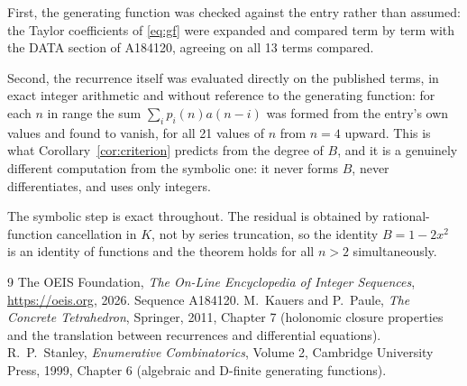 \documentclass[11pt,a4paper]{article}
\theoremstyle{plain}
\theoremstyle{definition}
\begin{document}
First, the generating function was checked against the entry rather than assumed: the
Taylor coefficients of \eqref{eq:gf} were expanded and compared term by term with the DATA
section of A184120, agreeing on all 13 terms compared.

Second, the recurrence itself was evaluated directly on the published terms, in exact
integer arithmetic and without reference to the generating function: for each $n$ in range
the sum $\sum_{i}p_{i}(n)a(n-i)$ was formed from the entry's own values and found to
vanish, for all 21 values of $n$ from $n=4$ upward. This is what
Corollary~\ref{cor:criterion} predicts from the degree of $B$, and it is a genuinely
different computation from the symbolic one: it never forms $B$, never differentiates, and
uses only integers.

The symbolic step is exact throughout. The residual is obtained by rational-function
cancellation in $K$, not by series truncation, so the identity $B=1 - 2 x^{2}$ is an
identity of functions and the theorem holds for all $n>2$ simultaneously.

\begin{thebibliography}{9}
 The OEIS Foundation, \emph{The On-Line Encyclopedia of Integer Sequences},
\url{https://oeis.org}, 2026. Sequence A184120.
 M.~Kauers and P.~Paule, \emph{The Concrete Tetrahedron}, Springer, 2011,
Chapter 7 (holonomic closure properties and the translation between recurrences and
differential equations).
 R.~P.~Stanley, \emph{Enumerative Combinatorics}, Volume 2, Cambridge
University Press, 1999, Chapter 6 (algebraic and D-finite generating functions).
\end{thebibliography}
\end{document}
